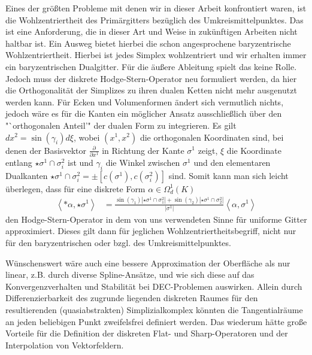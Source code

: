 Eines der größten Probleme mit denen wir in dieser Arbeit konfrontiert waren, ist die Wohlzentriertheit des Primärgitters bezüglich des
Umkreismittelpunktes. 
Das ist eine Anforderung, die in dieser Art und Weise in zukünftigen Arbeiten nicht haltbar ist.
Ein Ausweg bietet hierbei die schon angesprochene baryzentrische Wohlzentriertheit.
Hierbei ist jedes Simplex wohlzentriert und wir erhalten immer ein baryzentrischen Dualgitter.
Für die äußere Ableitung spielt das keine Rolle. 
Jedoch muss der diskrete Hodge-Stern-Operator neu formuliert werden, da hier die
Orthogonalität der Simplizes zu ihren dualen Ketten nicht mehr ausgenutzt werden kann. 
Für Ecken und Volumenformen ändert sich vermutlich nichts, jedoch wäre es für die Kanten ein möglicher Ansatz ausschließlich über den "`orthogonalen Anteil'" der dualen
Form zu integrieren.
Es gilt \( dx^{2}= \sin\left( \gamma_{i} \right) d\xi \), 
wobei \( \left( x^{1},x^{2} \right) \) die orthogonalen Koordinaten sind,
bei denen der Basisvektor \( \frac{\partial}{\partial x^{1}} \) in Richtung der Kante \( \sigma^{1} \) zeigt,
\( \xi \) die Koordinate entlang \( \star\sigma^{1}\cap\sigma^{2}_{i} \) ist
und \( \gamma_{i} \) die Winkel zwischen \( \sigma^{1} \) und den elementaren Dualkanten
\( \star\sigma^{1}\cap\sigma^{2}_{i} = \pm \left[ c(\sigma^{1}),c(\sigma^{2}_{i})  \right] \) sind.
Somit kann man sich leicht überlegen, dass für eine diskrete Form \( \alpha\in\Omega^{1}_{d}(K) \)
\begin{align}
  \left\langle *\alpha, \star\sigma^{1} \right\rangle
      &= \frac{\sin\left( \gamma_{1} \right)\left| \star\sigma^{1}\cap\sigma^{2}_{1} \right|
              +\sin\left( \gamma_{2} \right)\left| \star\sigma^{1}\cap\sigma^{2}_{2} \right| }
              {\left| \sigma^{1} \right|}
           \left\langle \alpha,\sigma^{1} \right\rangle
\end{align}
den Hodge-Stern-Operator in dem von uns verwendeten Sinne für uniforme Gitter approximiert.
Dieses gilt dann für jeglichen Wohlzentriertheitsbegriff, nicht nur für den baryzentrischen oder bzgl. des Umkreismittelpunktes.

Wünschenswert wäre auch eine bessere Approximation der Oberfläche als nur linear, z.B. durch diverse Spline-Ansätze, und wie sich diese auf das Konvergenzverhalten und
Stabilität bei DEC-Problemen auswirken. 
Allein durch Differenzierbarkeit des zugrunde liegenden diskreten Raumes für den resultierenden (quasiabstrakten) Simplizialkomplex
könnten die Tangentialräume an jeden beliebigen Punkt zweifelsfrei definiert werden.
Das wiederum hätte große Vorteile für die Definition der diskreten Flat- und Sharp-Operatoren und der Interpolation von Vektorfeldern.

